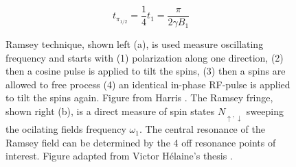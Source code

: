 \begin{equation}
    t_{\pi_{1/2}}=\frac{1}{4}t_1=\frac{\pi}{2 \gamma B_1}
\end{equation}


\begin{figure} [htbp]
	\center
	\hfill
	\caption {Ramsey technique, shown left (a), is used measure oscillating frequency and starts with (1) polarization along one direction, (2) then a cosine pulse is applied to tilt the spins, (3) then a spins are allowed to free process (4) an identical in-phase RF-pulse is applied to tilt the spins again. Figure from Harris \cite{Harris2007}. The Ramsey fringe, shown right (b), is a direct measure of spin states $N_{\uparrow, \downarrow}$ sweeping the ocilating fields frequency $\omega_1$. The central resonance of the Ramsey field can be determined by the 4 off resonance points of interest. Figure adapted from Victor H\'elaine's thesis \cite{Helaine2014}. }
		\label{fig:Ramsey}
\end{figure}


